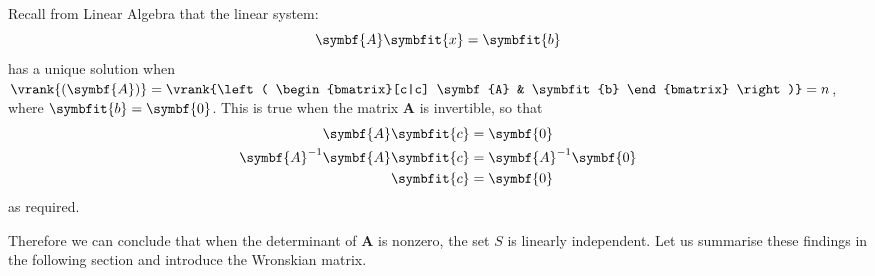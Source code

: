 \documentclass{article}
\begin{document}
Recall from Linear Algebra that the linear system:
\begin{equation*}
    \symbf{A} \symbfit{x} = \symbfit{b}
\end{equation*}
has a unique solution when \(\vrank{\left( \symbf{A} \right)} =
\vrank{\left( \begin{bmatrix}[c|c]
        \symbf{A} & \symbfit{b}
    \end{bmatrix} \right)} = n\), where \(\symbfit{b} = \symbf{0}\). This is true when the matrix
\(\symbf{A}\) is invertible, so that
\begin{align*}
    \symbf{A} \symbfit{c}                & = \symbf{0}                \\
    \symbf{A}^{-1} \symbf{A} \symbfit{c} & = \symbf{A}^{-1} \symbf{0} \\
    \symbfit{c}                          & = \symbf{0}
\end{align*}
as required.

Therefore we can conclude that when the determinant of \(\symbf{A}\) is nonzero, the set \(S\) is linearly independent.
Let us summarise these findings in the following section and introduce the Wronskian matrix.
\end{document}
